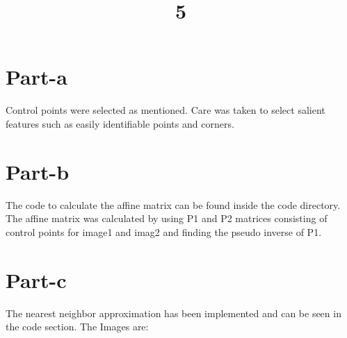 \documentclass[a4paper]{article}
\title{5}
\date{}
\begin{document}
\maketitle

\section{Part-a}
Control points were selected as mentioned. Care was taken to select salient features such as easily identifiable points and corners.

\section{Part-b}
The code to calculate the affine matrix can be found inside the code directory. The affine matrix was calculated by using P1 and P2 matrices consisting of control points for image1 and imag2  and finding the pseudo inverse of P1.


\section{Part-c}
The nearest neighbor approximation has been implemented and can be seen in the code section.
The Images are:
\end{document}
